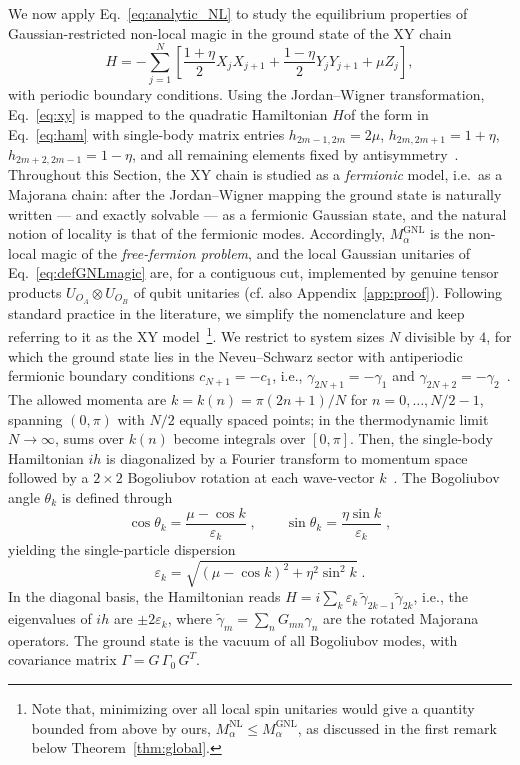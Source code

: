 \documentclass[prx,twocolumn,superscriptaddress,aps,10pt, frontmatterverbose, reprint,footinbib,longbibliography=true]{revtex4-2}
\newcommand{\RENYI}{\alpha}
\begin{document}
We now apply Eq.~\eqref{eq:analytic_NL} to study the equilibrium properties of Gaussian-restricted non-local magic in the ground state of the XY chain
\begin{equation}
    H = -\sum_{j=1}^{N}\!\left[\frac{1+\eta}{2}X_j X_{j+1} + \frac{1-\eta}{2}Y_j Y_{j+1} + \mu Z_j\right],
    \label{eq:xy}
\end{equation}
with periodic boundary conditions.
Using the Jordan--Wigner transformation, Eq.~\eqref{eq:xy} is mapped to the quadratic Hamiltonian $H$of the form in Eq.~\eqref{eq:ham} with single-body matrix entries $h_{2m-1,2m} = 2\mu$, $h_{2m,2m+1} = 1+\eta$, $h_{2m+2,2m-1} = 1-\eta$, and all remaining elements fixed by antisymmetry~\cite{Mbeng2024}. 
Throughout this Section, the XY chain is studied as a \emph{fermionic} model, i.e.\ as a Majorana chain: after the Jordan--Wigner mapping the ground state is naturally written --- and exactly solvable --- as a fermionic Gaussian state, and the natural notion of locality is that of the fermionic modes. 
Accordingly, $M_\RENYI^{\mathrm{GNL}}$ is the non-local magic of the \textit{free-fermion problem}, and the local Gaussian unitaries of Eq.~\eqref{eq:defGNLmagic} are, for a contiguous cut, implemented by genuine tensor products $U_{O_A}\otimes U_{O_B}$ of qubit unitaries (cf. also Appendix~\ref{app:proof}).
Following standard practice in the literature, we simplify the nomenclature and keep referring to it as the XY model~\footnote{Note that, minimizing over all local spin unitaries would give a quantity bounded from above by ours, $M_\RENYI^{\mathrm{NL}}\le M_\RENYI^{\mathrm{GNL}}$, as discussed in the first remark below Theorem~\ref{thm:global}.}. 
We restrict to system sizes $N$ divisible by $4$, for which the ground state lies in the Neveu--Schwarz sector with antiperiodic fermionic boundary
conditions $c_{N+1}=-c_1$, i.e., $\gamma_{2N+1}=-\gamma_1$ and $\gamma_{2N+2}=-\gamma_2$~\cite{Mbeng2024}.
The allowed momenta are 
$k=k(n)= \pi(2n+1)/N$ for $n = 0,\dots, N/2-1$, 
spanning $(0,\pi)$ with $N/2$ equally spaced points; 
in the thermodynamic limit $N\to\infty$, sums over $k(n)$ 
become integrals over $[0,\pi]$.
Then, the single-body Hamiltonian $ih$ is diagonalized by a Fourier transform to momentum space followed by a $2\times 2$ Bogoliubov rotation at each wave-vector $k$~\cite{Mbeng2024}.
The Bogoliubov angle $\theta_k$ is defined through
\begin{equation}
    \cos\theta_k = \frac{\mu - \cos k}{\varepsilon_k}\;,\qquad \sin\theta_k = \frac{\eta\sin k}{\varepsilon_k}\;,
    \label{eq:bogoliubov_angle}
\end{equation}
yielding the single-particle dispersion
\begin{equation}
    \varepsilon_k = \sqrt{(\mu-\cos k)^2 + \eta^2\sin^2 k}\;.
    \label{eq:dispersion}
\end{equation}
In the diagonal basis, the Hamiltonian reads $H = i\sum_k \varepsilon_k\,\tilde\gamma_{2k-1}\tilde\gamma_{2k}$, i.e., the eigenvalues of $ih$ are $\pm2\varepsilon_k$, where $\tilde\gamma_m = \sum_n G_{mn}\gamma_n$ are the rotated Majorana operators.
The ground state is the vacuum of all Bogoliubov modes, with covariance matrix $\Gamma = G\,\Gamma_0\, G^T$.
\end{document}
